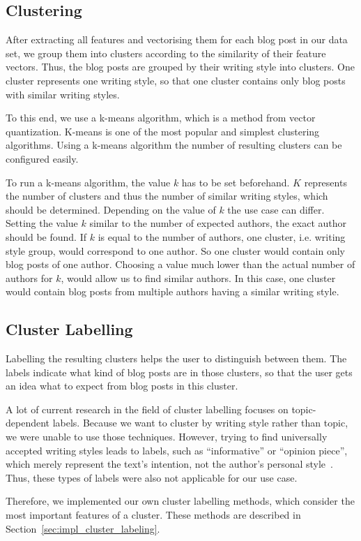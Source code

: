 
\subsection{Clustering}
\label{sec:clustering}

After extracting all features and vectorising them for each blog post in our data set, we group them into clusters according to the similarity of their feature vectors.
Thus, the blog posts are grouped by their writing style into clusters.
One cluster represents one writing style, so that one cluster contains only blog posts with similar writing styles.


To this end, we use a k-means algorithm, which is a method from vector quantization.
K-means is one of the most popular and simplest clustering algorithms.
Using a k-means algorithm the number of resulting clusters can be configured easily.


To run a k-means algorithm, the value $k$ has to be set beforehand.
$K$ represents the number of clusters and thus the number of similar writing styles, which should be determined.
Depending on the value of $k$ the use case can differ.
Setting the value $k$ similar to the number of expected authors, the exact author should be found.
If $k$ is equal to the number of authors, one cluster, i.e. writing style group, would correspond to one author.
So one cluster would contain only blog posts of one author.
Choosing a value much lower than the actual number of authors for $k$, would allow us to find similar authors.
In this case, one cluster would contain blog posts from multiple authors having a similar writing style.



\subsection{Cluster Labelling}
\label{sec:cluster_labeling}

Labelling the resulting clusters helps the user to distinguish between them.
The labels indicate what kind of blog posts are in those clusters, so that the user gets an idea what to expect from blog posts in this cluster.


A lot of current research in the field of cluster labelling focuses on topic-dependent labels.
Because we want to cluster by writing style rather than topic, we were unable to use those techniques.
However, trying to find universally accepted writing styles leads to labels, such as ``informative'' or ``opinion piece'', which merely represent the text's intention, not the author's personal style~\cite{lee2001genres}.
Thus, these types of labels were also not applicable for our use case.


Therefore, we implemented our own cluster labelling methods, which consider the most important features of a cluster.
These methods are described in Section~\ref{sec:impl_cluster_labeling}.